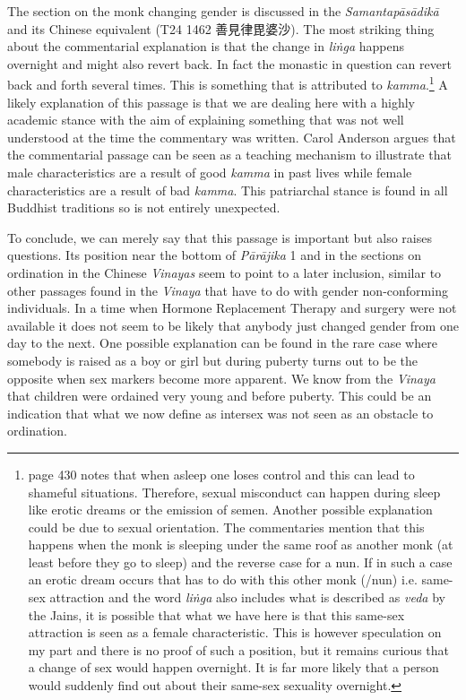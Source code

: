 The section on the monk changing gender is discussed in the {\em Samantapāsādikā} and its Chinese equivalent (T24 1462 善見律毘婆沙). The most striking thing about the commentarial explanation is that the change in {\em liṅga} happens overnight and might also revert back. In fact the monastic in question can revert back and forth several times. This is something that is attributed to {\em kamma}.\footnote{\cite{heirman} page 430 notes that when asleep one loses control and this can lead to shameful situations. Therefore, sexual misconduct can happen during sleep like erotic dreams or the emission of semen. Another possible explanation could be due to sexual orientation. The commentaries mention that this happens when the monk is sleeping under the same roof as another monk (at least before they go to sleep) and the reverse case for a nun. If in such a case an erotic dream occurs that has to do with this other monk (/nun) i.e. same-sex attraction and the word {\em liṅga} also includes what is described as {\em veda} by the Jains, it is possible that what we have here is that this same-sex attraction is seen as a female characteristic. This is however speculation on my part and there is no proof of such a position, but it remains curious that a change of sex would happen overnight. It is far more likely that a person would suddenly find out about their same-sex sexuality overnight.} A likely explanation of this passage is that we are dealing here with a highly academic stance with the aim of explaining something that was not well understood at the time the commentary was written. Carol Anderson argues that the commentarial passage can be seen as a teaching mechanism to illustrate that male characteristics are a result of good {\em kamma} in past lives while female characteristics are a result of bad {\em kamma}. This patriarchal stance is found in all Buddhist traditions so is not entirely unexpected. 

To conclude, we can merely say that this passage is important but also raises questions. Its position near the bottom of {\em Pārājika} 1 and in the sections on ordination in the Chinese {\em Vinayas} seem to point to a later inclusion, similar to other passages found in the {\em Vinaya} that have to do with gender non-conforming individuals. In a time when Hormone Replacement Therapy and surgery were not available it does not seem to be likely that anybody just changed gender from one day to the next. One possible explanation can be found in the rare case where somebody is raised as a boy or girl but during puberty turns out to be the opposite when sex markers become more apparent. We know from the {\em Vinaya} that children were ordained very young and before puberty. This could be an indication that what we now define as intersex was not seen as an obstacle to ordination.

